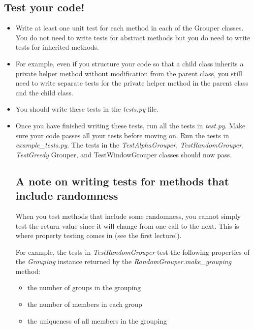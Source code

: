 \documentclass[12pt]{article}
\begin{document}
\subsection*{Test your code!}
\begin{itemize}
\item Write at least one unit test for each method in each of the Grouper classes. You
do not need to write tests for abstract methods but you do need to write tests
for inherited methods.

\item For example, even if you structure your code so that a child class
inherits a private helper method without modification from the parent class,
you still need to write separate tests for the private helper method in the
parent class and the child class.

\item You should write these tests in the \textit{tests.py} file.
\item Once you have finished writing these tests, run all the tests in
\textit{test.py}. Make sure your code passes all your tests before moving on.
Run the tests in \textit{example\_tests.py}. The tests in the \textit{TestAlphaGrouper},
\textit{TestRandomGrouper}, \textit{TestGreedy} Grouper, and TestWindowGrouper
classes should now pass.

\subsection*{A note on writing tests for methods that include randomness}
When you test methods that include some randomness, you cannot simply test the
return value since it will change from one call to the next. This is where property
testing comes in (see the first lecture!).

\bigskip

For example, the tests in \textit{TestRandomGrouper} test the following properties
of the \textit{Grouping} instance returned by the \textit{RandomGrouper.make\_grouping} method:

\begin{itemize}
    \item the number of groups in the grouping
    \item the number of members in each group
    \item the uniqueness of all members in the grouping
\end{itemize}

\bigskip


\end{itemize}
\end{document}
